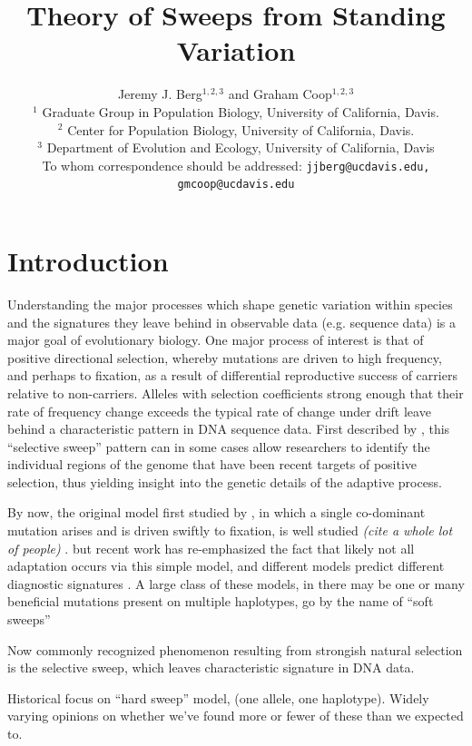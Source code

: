 \documentclass[a4paper,10pt]{article}
\title{Theory of Sweeps from Standing Variation}
\author{
Jeremy J. Berg$^{1,2,3}$ and Graham Coop$^{1,2,3}$ \\
$^1$ Graduate Group in Population Biology, University of California, Davis. \\
$^2$ Center for Population Biology, University of California, Davis.\\
$^3$ Department of Evolution and Ecology, University of California, Davis\\
\small To whom correspondence should be addressed: \texttt{jjberg@ucdavis.edu, gmcoop@ucdavis.edu}\\
}
\date{}
\newcommand{\jb}[1]{{\it\color{blue} (#1)} }
\begin{document}
\maketitle

\begin{abstract}
\end{abstract}

\section{Introduction}

Understanding the major processes which shape genetic variation within species and the signatures they leave behind in observable data (e.g. sequence data) is a major goal of evolutionary biology. One major process of interest is that of positive directional selection, whereby mutations are driven to high frequency, and perhaps to fixation, as a result of differential reproductive success of carriers relative to non-carriers. Alleles with selection coefficients strong enough that their rate of frequency change exceeds the typical rate of change under drift leave behind a characteristic pattern in DNA sequence data. First described by \cite{Smith1974}, this ``selective sweep'' pattern can in some cases allow researchers to identify the individual regions of the genome that have been recent targets of positive selection, thus yielding insight into the genetic details of the adaptive process.

By now, the original model first studied by \cite{Smith1974}, in which a single co-dominant mutation arises and is driven swiftly to fixation, is well studied \jb{cite a whole lot of people}. but recent work has re-emphasized the fact that likely not all adaptation occurs via this simple model, and different models predict different diagnostic signatures \citep{Innan:2004bk,Przeworski2005,Hermisson2005,Pennings2006a,Pennings2006,Coop:2012ec}. A large class of these models, in there may be one or many beneficial mutations present on multiple haplotypes, go by the name of ``soft sweeps''




Now commonly recognized phenomenon resulting from strongish natural selection is the selective sweep, which leaves characteristic signature in DNA data.

Historical focus on ``hard sweep'' model, (one allele, one haplotype). Widely varying opinions on whether we've found more or fewer of these than we expected to.
\end{document}

